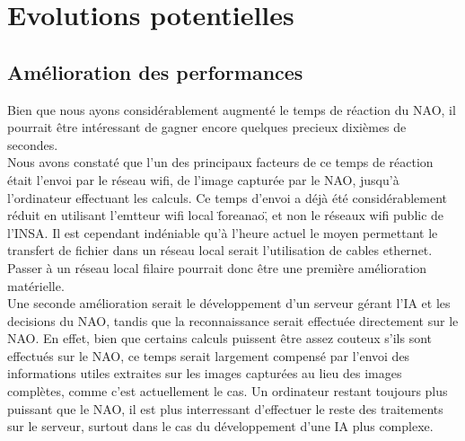 \section{Evolutions potentielles}
\label{sec:Evolutions potentielles}

  \subsection{Amélioration des performances}
  \label{sub:Améliorations des performances}
    \par Bien que nous ayons considérablement augmenté le temps de réaction du NAO, il pourrait être intéressant de gagner encore quelques precieux dixièmes de secondes.\\
    Nous avons constaté que l'un des principaux facteurs de ce temps de réaction était l'envoi par le réseau wifi, de l'image capturée par le NAO, jusqu'à l'ordinateur effectuant les calculs.
    Ce temps d'envoi a déjà été considérablement réduit en utilisant l'emtteur wifi local \"foreanao\", et non le réseaux wifi public de l'INSA.
    Il est cependant indéniable qu'à l'heure actuel le moyen permettant le transfert de fichier dans un réseau local serait l'utilisation de cables ethernet.
    Passer à un réseau local filaire pourrait donc être une première amélioration matérielle.\\
    Une seconde amélioration serait le développement d'un serveur gérant l'IA et les decisions du NAO, tandis que la reconnaissance serait effectuée directement sur le NAO.
    En effet, bien que certains calculs puissent être assez couteux s'ils sont effectués sur le NAO,
    ce temps serait largement compensé par l'envoi des informations utiles extraites sur les images capturées au lieu des images complètes, comme c'est actuellement le cas.
    Un ordinateur restant toujours plus puissant que le NAO, il est plus interressant d'effectuer le reste des traitements sur le serveur, surtout dans le cas du développement d'une IA plus complexe.\\

